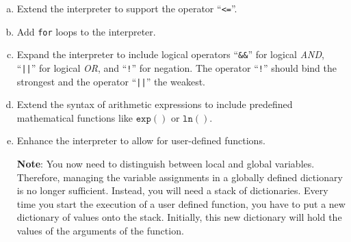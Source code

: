 \exercise
\begin{enumerate}[(a)]
\item Extend the interpreter to support the operator ``\texttt{<=}''.
\item Add \texttt{for} loops to the interpreter.
\item Expand the interpreter to include logical operators
      ``\texttt{\&\&}'' for logical \emph{AND}, ``\texttt{||}'' for logical \emph{OR},
      and ``\texttt{!}'' for negation. The operator ``\texttt{!}'' should bind the
      strongest and the operator ``\texttt{||}'' the weakest.
\item Extend the syntax of arithmetic expressions to include predefined
      mathematical functions like $\texttt{exp}()$ or $\texttt{ln}()$.
\item Enhance the interpreter to allow for user-defined functions.
      
      \textbf{Note}: You now need to distinguish between local and global variables.
      Therefore, managing the variable assignments in a globally defined dictionary is no
      longer sufficient.  Instead, you will need a  stack of dictionaries.  Every time you
      start the execution of a user defined function, you have to put a new dictionary of
      values onto the stack.  Initially, this new dictionary will hold the values of the
      arguments of the function.
      \eox 
\end{enumerate}

